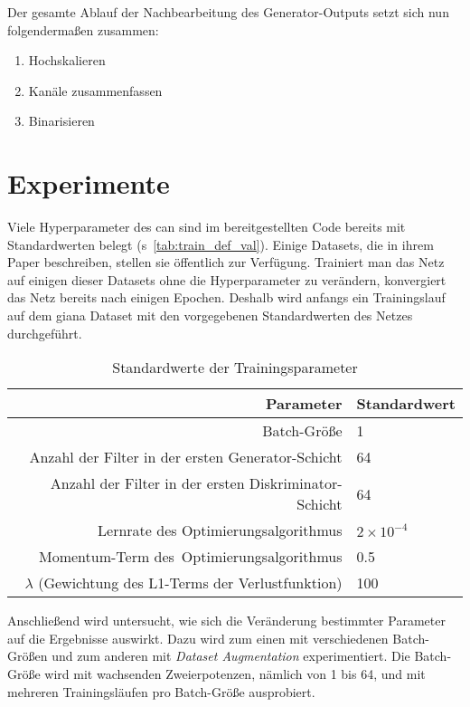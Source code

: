 Der gesamte Ablauf der Nachbearbeitung des Generator-Outputs setzt sich nun folgendermaßen zusammen:

\begin{enumerate}
	\item Hochskalieren
	\item Kanäle zusammenfassen
	\item Binarisieren
\end{enumerate}



\section{Experimente}

Viele Hyperparameter des \gls{can} sind im bereitgestellten Code bereits mit Standardwerten belegt (s~\autoref{tab:train_def_val}).
Einige Datasets, die \citeauthor{Isola.2017} in ihrem Paper beschreiben, stellen sie öffentlich zur Verfügung.
Trainiert man das Netz auf einigen dieser Datasets ohne die Hyperparameter zu verändern, konvergiert das Netz bereits nach einigen Epochen.
Deshalb wird anfangs ein Trainingslauf auf dem \gls{giana} Dataset mit den vorgegebenen Standardwerten des Netzes durchgeführt.

\begin{table}
	\centering
	\caption{Standardwerte der Trainingsparameter}
	\label{tab:train_def_val}
	\begin{tabular}{rl} 
		\toprule
		Parameter & Standardwert \\ 
		\midrule
		Batch-Größe & 1 \\
		Anzahl der Filter in der ersten Generator-Schicht & 64 \\
		Anzahl der Filter in der ersten Diskriminator-Schicht & 64 \\
		Lernrate des Optimierungsalgorithmus & $ 2 \times 10^{-4} $ \\
		Momentum-Term des~Optimierungsalgorithmus & 0.5 \\
		$ \lambda $ (Gewichtung des L1-Terms der Verlustfunktion) & 100 \\
		\bottomrule
	\end{tabular}
\end{table}

Anschließend wird untersucht, wie sich die Veränderung bestimmter Parameter auf die Ergebnisse auswirkt.
Dazu wird zum einen mit verschiedenen Batch-Größen und zum anderen mit \emph{Dataset Augmentation} experimentiert.
Die Batch-Größe wird mit wachsenden Zweierpotenzen, nämlich von 1 bis 64, und mit mehreren Trainingsläufen pro Batch-Größe ausprobiert.

